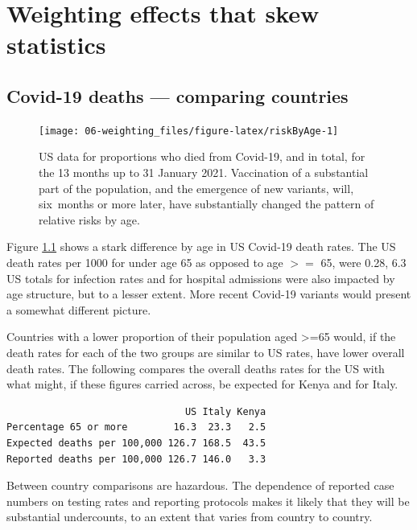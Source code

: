 \documentclass[
  10pt,
  b5paper]{book}
\begin{document}
\hypertarget{sec:yule1}{%
\chapter{Weighting effects that skew statistics}\label{sec:yule1}}

\hypertarget{covid-19-deaths-comparing-countries}{%
\section{Covid-19 deaths --- comparing countries}\label{covid-19-deaths-comparing-countries}}

\begin{figure}[H]

{\centering \texttt{[image: 06-weighting\_files/figure-latex/riskByAge-1]} 

}

\caption{US data for proportions who died from Covid-19, and in total,
for the 13 months up to 31 January 2021. Vaccination of a substantial 
part of the population, and the emergence of new variants, will,
six months or more later, have substantially changed the pattern
of relative risks by age.}\label{fig:riskByAge}
\end{figure}

Figure \ref{fig:riskByAge} shows a stark difference by age in US Covid-19 death rates. The US death rates per 1000 for under age 65 as opposed to age \(>=\) 65, were 0.28, 6.3 US totals for infection rates and for hospital admissions were also impacted by age structure, but to a lesser extent. More recent Covid-19 variants would present a somewhat different picture.

Countries with a lower proportion of their population aged \textgreater=65 would, if the death rates for each of the two groups are similar to US rates, have lower overall death rates. The following compares the overall deaths rates for the US with what might, if these figures carried across, be expected for Kenya and for Italy.

\begin{verbatim}
                               US Italy Kenya
Percentage 65 or more        16.3  23.3   2.5
Expected deaths per 100,000 126.7 168.5  43.5
Reported deaths per 100,000 126.7 146.0   3.3
\end{verbatim}

Between country comparisons are hazardous. The dependence of reported case numbers on testing rates and reporting protocols makes it likely that they will be substantial undercounts, to an extent that varies from country to country.
\end{document}
